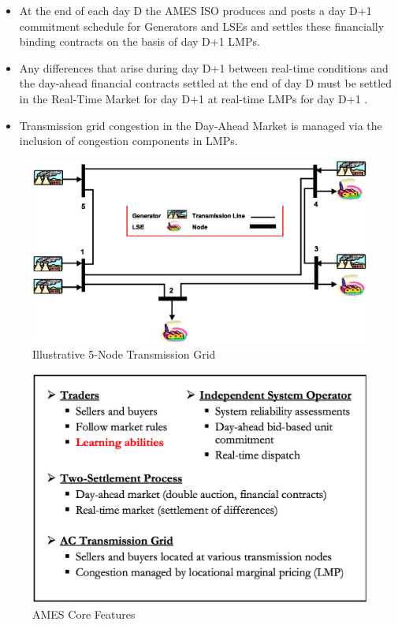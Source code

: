 \documentclass[12pt]{article}
\begin{document}
\begin{itemize}
\item At the end of each day D the AMES ISO produces and posts a day D+1 commitment schedule for 
Generators and LSEs and settles these financially binding contracts on the basis of 
day D+1 LMPs.  


\item Any differences that arise during day D+1  between real-time conditions and 
the day-ahead financial contracts settled at the end of day D must be settled  
in the Real-Time Market for day D+1  at real-time LMPs for day D+1 .

\item
Transmission grid congestion in the Day-Ahead Market is managed via the inclusion of congestion
components in LMPs.

                    \end{itemize}


\begin{figure}
	\centering
		\includegraphics[totalheight = 9cm]{AMES.TransGrid.eps}
	\caption{Illustrative 5-Node Transmission Grid}
	\label{fig:AMES.TransGrid}
\end{figure}  


\begin{figure}
	\centering
		\includegraphics[totalheight = 9cm]{AMES.core.eps}
	\caption{AMES Core Features}
	\label{fig:AMES.core}
\end{figure}  
\end{document}
